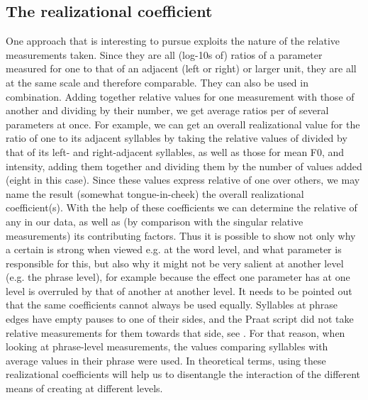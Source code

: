 \documentclass[output=paper]{LSP/langsci}
\begin{document}
\subsection{The realizational coefficient} 
One approach that is interesting to pursue exploits the nature of the relative measurements taken. Since they are all (log-10s of) ratios of a parameter measured for one  to that of an adjacent (left or right)  or larger unit, they are all at the same scale and therefore comparable. They can also be used in combination. Adding together relative values for one measurement with those of another and dividing by their number, we get average ratios per  of several parameters at once. For example, we can get an overall realizational value for the ratio of one  to its adjacent syllables by taking the relative values of  divided by that of its left- and right-adjacent syllables, as well as those for mean F0,  and intensity, adding them together and dividing them by the number of values added (eight in this case). Since these values express relative  of one  over others, we may name the result (somewhat tongue-in-cheek) the overall realizational coefficient(s). With the help of these coefficients we can determine the relative  of any  in our data, as well as (by comparison with the singular relative measurements) its contributing factors. Thus it is possible to show not only why a certain  is strong when viewed e.g. at the word level, and what parameter is responsible for this, but also why it might not be very salient at another level (e.g. the phrase level), for example because the effect one parameter has at one level is overruled by that of another at another level. It needs to be pointed out that the same coefficients cannot always be used equally. Syllables at phrase edges have empty pauses to one of their sides, and the {Praat} script did not take relative measurements for them towards that side, see . For that reason, when looking at phrase-level measurements, the values comparing syllables with average  values in their phrase were used. In theoretical terms, using these realizational coefficients will help us to disentangle the interaction of the different means of creating  at different levels.
\end{document}
